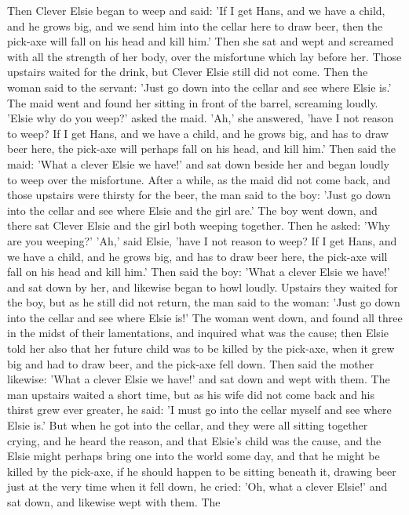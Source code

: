 \documentclass[12pt]{book}
\begin{document}
Then Clever Elsie began to weep and said: 'If I get Hans, and we have
a child, and he grows big, and we send him into the cellar here to
draw beer, then the pick-axe will fall on his head and kill him.' Then
she sat and wept and screamed with all the strength of her body, over
the misfortune which lay before her. Those upstairs waited for the
drink, but Clever Elsie still did not come. Then the woman said to the
servant: 'Just go down into the cellar and see where Elsie is.' The
maid went and found her sitting in front of the barrel, screaming
loudly. 'Elsie why do you weep?' asked the maid. 'Ah,' she answered,
'have I not reason to weep? If I get Hans, and we have a child, and he
grows big, and has to draw beer here, the pick-axe will perhaps fall
on his head, and kill him.' Then said the maid: 'What a clever Elsie
we have!' and sat down beside her and began loudly to weep over the
misfortune. After a while, as the maid did not come back, and those
upstairs were thirsty for the beer, the man said to the boy: 'Just go
down into the cellar and see where Elsie and the girl are.' The boy
went down, and there sat Clever Elsie and the girl both weeping
together. Then he asked: 'Why are you weeping?' 'Ah,' said Elsie,
'have I not reason to weep? If I get Hans, and we have a child, and he
grows big, and has to draw beer here, the pick-axe will fall on his
head and kill him.' Then said the boy: 'What a clever Elsie we have!'
and sat down by her, and likewise began to howl loudly. Upstairs they
waited for the boy, but as he still did not return, the man said to
the woman: 'Just go down into the cellar and see where Elsie is!' The
woman went down, and found all three in the midst of their
lamentations, and inquired what was the cause; then Elsie told her
also that her future child was to be killed by the pick-axe, when it
grew big and had to draw beer, and the pick-axe fell down. Then said
the mother likewise: 'What a clever Elsie we have!' and sat down and
wept with them. The man upstairs waited a short time, but as his wife
did not come back and his thirst grew ever greater, he said: 'I must
go into the cellar myself and see where Elsie is.' But when he got
into the cellar, and they were all sitting together crying, and he
heard the reason, and that Elsie's child was the cause, and the Elsie
might perhaps bring one into the world some day, and that he might be
killed by the pick-axe, if he should happen to be sitting beneath it,
drawing beer just at the very time when it fell down, he cried: 'Oh,
what a clever Elsie!' and sat down, and likewise wept with them. The
\end{document}
